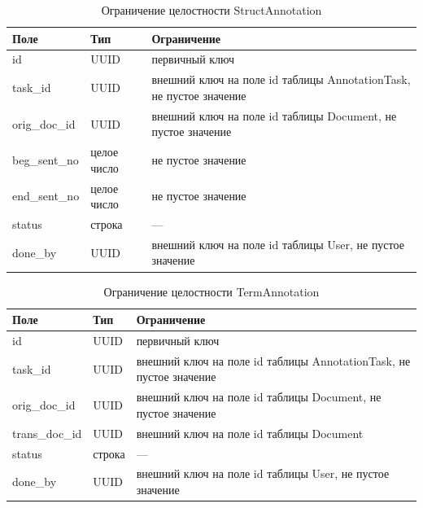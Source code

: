 \begin{table}[H]
\centering
\caption{Ограничение целостности StructAnnotation}
\begin{tabular}{|m{3cm}|m{3cm}|m{6cm}|}
\hline
\textbf{Поле} & \textbf{Тип} & \textbf{Ограничение} \\ \hline
id & UUID & первичный ключ \\ \hline
task\_id & UUID & внешний ключ на поле id таблицы AnnotationTask, не пустое значение \\ \hline
orig\_doc\_id & UUID & внешний ключ на поле id таблицы Document, не пустое значение \\ \hline
beg\_sent\_no & целое число & не пустое значение \\ \hline
end\_sent\_no & целое число & не пустое значение \\ \hline
status & строка & --- \\ \hline
done\_by & UUID & внешний ключ на поле id таблицы User, не пустое значение \\ \hline
\end{tabular}
\label{tab:structannot}
\end{table}

\begin{table}[H]
\centering
\caption{Ограничение целостности TermAnnotation}
\begin{tabular}{|m{3cm}|m{3cm}|m{6cm}|}
\hline
\textbf{Поле} & \textbf{Тип} & \textbf{Ограничение} \\ \hline
id & UUID & первичный ключ \\ \hline
task\_id & UUID & внешний ключ на поле id таблицы AnnotationTask, не пустое значение \\ \hline
orig\_doc\_id & UUID & внешний ключ на поле id таблицы Document, не пустое значение \\ \hline
trans\_doc\_id & UUID & внешний ключ на поле id таблицы Document \\ \hline
status & строка & --- \\ \hline
done\_by & UUID & внешний ключ на поле id таблицы User, не пустое значение \\ \hline
\end{tabular}
\label{tab:termannot}
\end{table}

